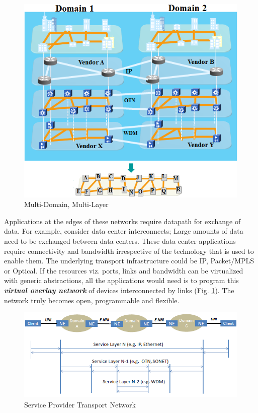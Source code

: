 \documentclass{sig-alternate-10pt}
\begin{document}
\begin{figure}[htb]
	\centering
	\includegraphics[scale=0.50]{MultiDomainLayer.png}
	\caption{Multi-Domain, Multi-Layer}
	\label{fig:MDL}
	\end{figure}
	
	Applications at the edges of these networks require datapath for exchange of data. For example, consider data
	center interconnects; Large amounts of data need to be exchanged between data centers. These data center
	applications require connectivity and bandwidth irrespective of the technology that is used to enable
	them. The underlying transport infrastructure could be IP, Packet/MPLS or Optical. If the resources viz.
	ports, links and bandwidth can be virtualized with generic abstractions, all the applications would need
	is to program this \emph{\bf virtual overlay network} of devices interconnected by links (Fig.
	\ref{fig:MDL}). The network truly becomes open, programmable and flexible. \\
		
	\begin{figure}[htb]
	\centering
	\includegraphics[scale=0.50]{MLwoOF.png}
	\caption{Service Provider Transport Network}
	\label{fig:MLwoOF}
	\end{figure}
\end{document}

